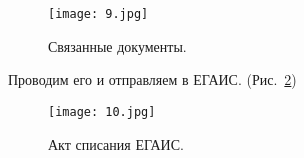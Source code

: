 \begin{itemize}
		
	\begin{figure}[H]
		\texttt{[image: 9.jpg]}
		\caption{Связанные документы.}
		\label{ris:9.jpg}
	\end{figure}
	
	\newpage
	 Проводим его и отправляем в ЕГАИС. (Рис.~\ref{ris:10.jpg})
	 
	 	\begin{figure}[H]
	 	\texttt{[image: 10.jpg]}
	 	\caption{Акт списания ЕГАИС.}
	 	\label{ris:10.jpg}
	 \end{figure}
	 
	
	\par
	
\end{itemize}
